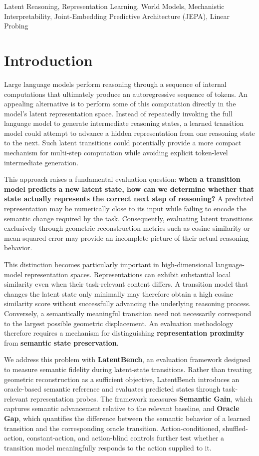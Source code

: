 \documentclass[conference]{IEEEtran}
\begin{document}
\begin{IEEEkeywords}
Latent Reasoning, Representation Learning, World Models, Mechanistic Interpretability, Joint-Embedding Predictive Architecture (JEPA), Linear Probing
\end{IEEEkeywords}

\section{Introduction}

Large language models perform reasoning through a sequence of internal computations that ultimately produce an autoregressive sequence of tokens. An appealing alternative is to perform some of this computation directly in the model's latent representation space. Instead of repeatedly invoking the full language model to generate intermediate reasoning states, a learned transition model could attempt to advance a hidden representation from one reasoning state to the next. Such latent transitions could potentially provide a more compact mechanism for multi-step computation while avoiding explicit token-level intermediate generation.

This approach raises a fundamental evaluation question: \textbf{when a transition model predicts a new latent state, how can we determine whether that state actually represents the correct next step of reasoning?} A predicted representation may be numerically close to its input while failing to encode the semantic change required by the task. Consequently, evaluating latent transitions exclusively through geometric reconstruction metrics such as cosine similarity or mean-squared error may provide an incomplete picture of their actual reasoning behavior.

This distinction becomes particularly important in high-dimensional language-model representation spaces. Representations can exhibit substantial local similarity even when their task-relevant content differs. A transition model that changes the latent state only minimally may therefore obtain a high cosine similarity score without successfully advancing the underlying reasoning process. Conversely, a semantically meaningful transition need not necessarily correspond to the largest possible geometric displacement. An evaluation methodology therefore requires a mechanism for distinguishing \textbf{representation proximity} from \textbf{semantic state preservation}.

We address this problem with \textbf{LatentBench}, an evaluation framework designed to measure semantic fidelity during latent-state transitions. Rather than treating geometric reconstruction as a sufficient objective, LatentBench introduces an oracle-based semantic reference and evaluates predicted states through task-relevant representation probes. The framework measures \textbf{Semantic Gain}, which captures semantic advancement relative to the relevant baseline, and \textbf{Oracle Gap}, which quantifies the difference between the semantic behavior of a learned transition and the corresponding oracle transition. Action-conditioned, shuffled-action, constant-action, and action-blind controls further test whether a transition model meaningfully responds to the action supplied to it. 
\end{document}
